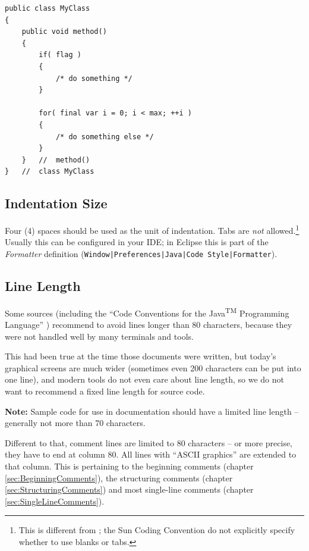 \documentclass[12pt,a4paper,titlepage, parskip=half, headsepline, footsepline, cleardoubleplain]{scrbook}
\begin{document}
\begin{lstlisting}
public class MyClass
{
    public void method()
    {
        if( flag )
        {
            /* do something */
        }
        
        for( final var i = 0; i < max; ++i )
        {
            /* do something else */
        } 
    }   //  method()
}   //  class MyClass
\end{lstlisting}

\subsection{Indentation Size}
Four (4) spaces should be used as the unit of indentation. Tabs are \textit{not} allowed.\footnote{This is different from \autocite{SUN_CODE_CONVENTIONS}; the Sun Coding Convention do not explicitly specify whether to use blanks or tabs.} Usually this can be configured in your IDE; in Eclipse this is part of the \textit{Formatter} definition (\verb#Window|Preferences|Java|Code Style|Formatter#).

\subsection{Line Length}\label{sec:LineLength}
Some sources (including the “Code Conventions for the Java\textsuperscript{TM} Programming Language” \autocite{SUN_CODE_CONVENTIONS}) recommend to avoid lines longer than 80 characters, because they were not handled well by many terminals and tools.

This had been true at the time those documents were written, but today's  graphical screens are much wider (sometimes even 200 characters can be put into one line), and modern tools do not even care about line length, so we do not want to recommend a fixed line length for source code.

\textbf{Note:} Sample code for use in documentation should have a limited line length – generally not more than 70 characters.

Different to that, comment lines are limited to 80 characters – or more precise, they have to end at column 80. All lines with “ASCII graphics” are extended to that column. This is pertaining to the beginning comments (chapter \vref{sec:BeginningComments}), the structuring comments (chapter \vref{sec:StructuringComments}) and most single-line comments (chapter \ref{sec:SingleLineComments}).
\end{document}
